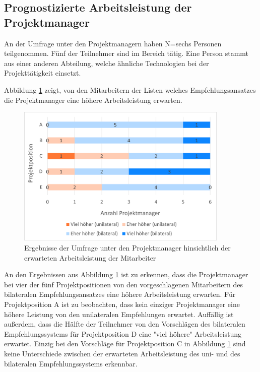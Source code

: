 \subsection{Prognostizierte Arbeitsleistung der Projektmanager}
\label{ch:ergebnisse:fallstudie:arbeitsleistung}
An der Umfrage unter den Projektmanagern haben N=sechs Personen teilgenommen. Fünf der Teilnehmer sind im Bereich \JES tätig. Eine Person stammt aus einer anderen Abteilung, welche ähnliche Technologien bei der Projekttätigkeit einsetzt.

Abbildung \ref{fig:ergebnisse:fallstudie:arbeitsleistung:abb1} zeigt, von den Mitarbeitern der Listen welches Empfehlungsansatzes die Projektmanager eine höhere Arbeitsleistung erwarten.

\begin{figure}[h]
	\centering
	\includegraphics[width=0.9\textwidth]{gfx/ergebnisse-projektmanager-arbeitsleistung.png}	
	\caption{Ergebnisse der Umfrage unter den Projektmanager hinsichtlich der erwarteten Arbeitsleistung der Mitarbeiter}
	\label{fig:ergebnisse:fallstudie:arbeitsleistung:abb1}
\end{figure}

An den Ergebnissen aus Abbildung \ref{fig:ergebnisse:fallstudie:arbeitsleistung:abb1} ist zu erkennen, dass die Projektmanager bei vier der fünf Projektpositionen von den vorgeschlagenen Mitarbeitern des bilateralen Empfehlungsansatzes eine höhere Arbeitsleistung erwarten. Für Projektposition A ist zu beobachten, dass kein einziger Projektmanager eine höhere Leistung von den unilateralen Empfehlungen erwartet. Auffällig ist außerdem, dass die Hälfte der Teilnehmer von den Vorschlägen des bilateralen Empfehlungssystems für Projektposition D eine "viel höhere" Arbeitsleistung erwartet. Einzig bei den Vorschläge für Projektposition C in Abbildung \ref{fig:ergebnisse:fallstudie:arbeitsleistung:abb1} sind keine Unterschiede zwischen der erwarteten Arbeitsleistung des uni- und des bilateralen Empfehlungssystems erkennbar.

